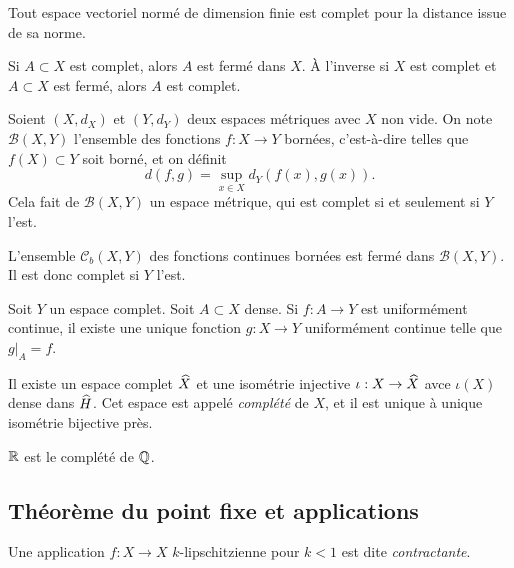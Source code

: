 \documentclass[twocolumn, landscape]{article}
\begin{document}
\begin{coro}
    Tout espace vectoriel normé de dimension finie est complet pour la distance issue de sa norme.
\end{coro}

\begin{prop}
    Si $A \subset X$ est complet, alors $A$ est fermé dans $X$. À l'inverse si $X$ est complet et $A\subset X$ est fermé, alors $A$ est complet. 
\end{prop}

\begin{prop}
    Soient $(X, d_X)$ et $(Y, d_Y)$ deux espaces métriques avec $X$ non vide. On note $\mathscr{B}(X, Y)$ l'ensemble des fonctions $f:X\to Y$ bornées, c'est-à-dire telles que $f(X) \subset Y$ soit borné, et on définit
    $$d(f,g) = \sup_{x\in X} d_Y(f(x), g(x)).$$
    Cela fait de $\mathscr{B}(X,Y)$ un espace métrique, qui est complet si et seulement si $Y$ l'est. 
\end{prop}

\begin{prop}
    L'ensemble $\mathscr{C}_b(X,Y)$ des fonctions continues bornées est fermé dans $\mathscr{B}(X,Y)$. Il est donc complet si $Y$ l'est. 
\end{prop}

\begin{prop}
    Soit $Y$ un espace complet. Soit $A \subset X$ dense. Si $f : A \to Y$ est uniformément continue, il existe une unique fonction $g: X\to Y$ uniformément continue telle que $g|_A = f$.
\end{prop}

\begin{prop}
    Il existe un espace complet $\widehat{X}$ et une isométrie injective $\iota : X \to \widehat{X}$ avce $\iota(X)$ dense dans $\widehat{H}$. Cet espace est appelé \emph{complété} de $X$, et il est unique à unique isométrie bijective près.  
\end{prop}

\begin{exem}
    $\mathbb{R}$ est le complété de $\mathbb{Q}$.
\end{exem}

\subsection{Théorème du point fixe et applications \cite{Demailly}}

\begin{defi}
    Une application $f: X\to X$ $k$-lipschitzienne pour $k<1$ est dite \emph{contractante}.
\end{defi}
\end{document}
